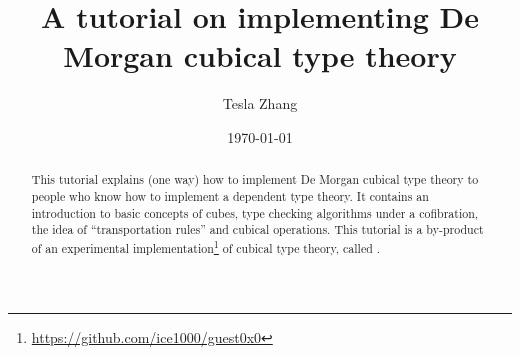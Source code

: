 \documentclass[reqno]{amsart}
\begin{document}
\title{A tutorial on implementing De Morgan cubical type theory}

\author{Tesla Zhang}
\address{The Pennsylvania State University}
\date\today


\begin{abstract}
This tutorial explains (one way) how to implement De Morgan cubical type theory
to people who know how to implement a dependent type theory. It contains an introduction
to basic concepts of cubes, type checking algorithms under a cofibration,
the idea of ``transportation rules'' and cubical operations.
This tutorial is a by-product of an experimental implementation\footnote
{\url{https://github.com/ice1000/guest0x0}} of cubical type theory,
called \GuestName.
\end{abstract}
\maketitle
\tableofcontents


\printbibliography
\end{document}
